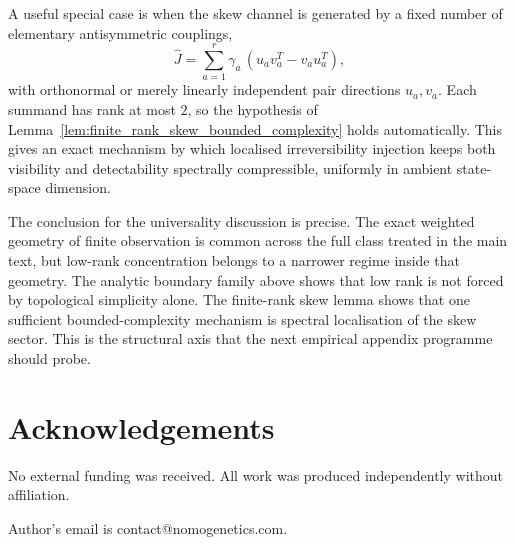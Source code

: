 \documentclass[11pt,a4paper]{article}
\numberwithin{equation}{section}
\theoremstyle{thmcompact}
\theoremstyle{remark}
\begin{document}
A useful special case is when the skew channel is generated by a fixed number of elementary antisymmetric couplings,
\begin{equation}
\widehat J=\sum_{a=1}^{r}\gamma_a\,(u_av_a^T-v_au_a^T),
\end{equation}
with orthonormal or merely linearly independent pair directions \(u_a,v_a\). Each summand has rank at most \(2\), so the hypothesis of Lemma~\ref{lem:finite_rank_skew_bounded_complexity} holds automatically. This gives an exact mechanism by which localised irreversibility injection keeps both visibility and detectability spectrally compressible, uniformly in ambient state-space dimension.

The conclusion for the universality discussion is precise. The exact weighted geometry of finite observation is common across the full class treated in the main text, but low-rank concentration belongs to a narrower regime inside that geometry. The analytic boundary family above shows that low rank is not forced by topological simplicity alone. The finite-rank skew lemma shows that one sufficient bounded-complexity mechanism is spectral localisation of the skew sector. This is the structural axis that the next empirical appendix programme should probe.

\section*{Acknowledgements}

No external funding was received. All work was produced independently without affiliation.

Author's email is contact@nomogenetics.com.
\end{document}
